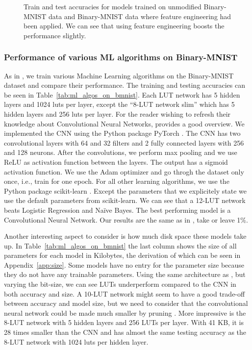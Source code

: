 \begin{figure}[!htb]
    \centering
    
    \caption{Train and test accuracies for models trained on unmodified Binary-MNIST data and Binary-MNIST data where feature engineering had been applied. We can see that using feature engineering boosts the performance slightly.}
\label{fig:sobel_acc}
\end{figure}
\FloatBarrier

\subsubsection{Performance of various ML algorithms on Binary-MNIST} \label{sec:models}
As in \cite{bib:chatterjee2018learning}, we train various Machine Learning algorithms on the Binary-MNIST dataset and compare their performance. The training and testing accuracies can be seen in Table~\ref{tab:ml_algos_on_bmnist}. Each LUT network has 5 hidden layers and 1024 luts per layer, except the \enquote{8-LUT network slim} which has 5 hidden layers and 256 luts per layer. For the reader wishing to refresh their knowledge about Convolutional Neural Networks, \cite{bib:yamashita2018convolutional} provides a good overview. We implemented the CNN using the Python package PyTorch \cite{bib:NEURIPS2019-9015}. The CNN has two convolutional layers with 64 and 32 filters and 2 fully connected layers with 256 and 128 neurons. After the convolutions, we perform max pooling and we use ReLU as activation function between the layers. The output has a sigmoid activation function. We use the Adam optimizer and go throgh the dataset only once, i.e., train for one epoch. For all other learning algorithms, we use the Python package scikit-learn \cite{bib:scikit-learn}. Except the parameters that we explicitely state we use the default parameters from scikit-learn. We can see that a 12-LUT network beats Logistic Regression and Naïve Bayes. The best performing model is a Convolutional Neural Network. Our results are the same as in \cite{bib:chatterjee2018learning}, take or leave 1\%.

Another interesting aspect to consider is how much disk space these models take up. In Table~\ref{tab:ml_algos_on_bmnist} the last column shows the size of all parameters for each model in Kilobytes, the derivation of which can be seen in Appendix~\ref{app:size}. Some models have no entry for the parameter size because they do not have any trainable parameters. Using the same architecture as \cite{bib:chatterjee2018learning}, but varying the bit-size, we can see LUTs underperform compared to the CNN in both accuracy and size. A 10-LUT network might seem to have a good trade-off between accuracy and model size, but we need to consider that the convolutional neural network could be made much smaller by pruning \cite{bib:molchanov2016pruning}. More impressive is the 8-LUT network with 5 hidden layers and 256 LUTs per layer. With 41 KB, it is 28 times smaller than the CNN and has almost the same testing accuracy as the 8-LUT network with 1024 luts per hidden layer.

